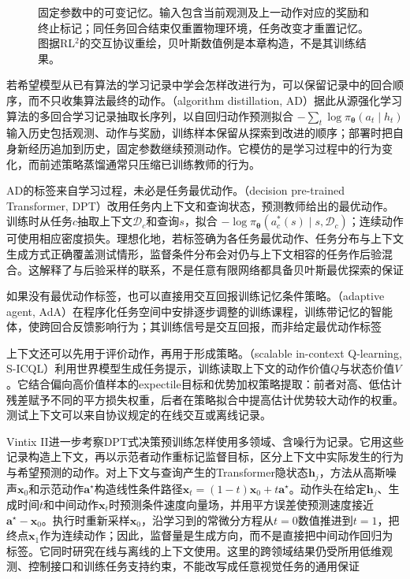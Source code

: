 \begin{figure}[htbp]
 \centering
 
 \caption{固定参数中的可变记忆。输入包含当前观测及上一动作对应的奖励和终止标记；同任务回合结束仅重置物理环境，任务改变才重置记忆。图据RL$^2$的交互协议重绘，贝叶斯数值例是本章构造，不是其训练结果。}
 \label{fig:rl-transfer-rl2-memory}
\end{figure}

若希望模型从已有算法的学习记录中学会怎样改进行为，可以保留记录中的回合顺序，而不只收集算法最终的动作。（algorithm distillation, AD）据此从源强化学习算法的多回合学习记录抽取长序列，以自回归动作预测拟合
$-\sum_t\log\pi_{\bm\theta}(a_t\mid h_t)$
输入历史包括观测、动作与奖励，训练样本保留从探索到改进的顺序；部署时把自身新经历追加到历史，固定参数继续预测动作。它模仿的是学习过程中的行为变化，而前述策略蒸馏通常只压缩已训练教师的行为。

AD的标签来自学习过程，未必是任务最优动作。（decision pre-trained Transformer, DPT）改用任务内上下文和查询状态，预测教师给出的最优动作。训练时从任务$c$抽取上下文$\mathcal D_c$和查询$s$，拟合
$-\log\pi_{\bm\theta}(a_c^*(s)\mid s,\mathcal D_c)$；连续动作可使用相应密度损失。理想化地，若标签确为各任务最优动作、任务分布与上下文生成方式正确覆盖测试情形，监督条件分布会对仍与上下文相容的任务作后验混合。这解释了与后验采样的联系，不是任意有限网络都具备贝叶斯最优探索的保证

如果没有最优动作标签，也可以直接用交互回报训练记忆条件策略。（adaptive agent, AdA）在程序化任务空间中安排逐步调整的训练课程，训练带记忆的智能体，使跨回合反馈影响行为；其训练信号是交互回报，而非给定最优动作标签

上下文还可以先用于评价动作，再用于形成策略。（scalable in-context Q-learning, S-ICQL）利用世界模型生成任务提示，训练读取上下文的动作价值$Q$与状态价值$V$。它结合偏向高价值样本的expectile目标和优势加权策略提取：前者对高、低估计残差赋予不同的平方损失权重，后者在策略拟合中提高估计优势较大动作的权重。测试上下文可以来自协议规定的在线交互或离线记录。

Vintix II进一步考察DPT式决策预训练怎样使用多领域、含噪行为记录。它用这些记录构造上下文，再以示范者动作重标记监督目标，区分上下文中实际发生的行为与希望预测的动作。对上下文与查询产生的Transformer隐状态$\bm h_j$，方法从高斯噪声$\bm x_0$和示范动作$\bm a^\star$构造线性条件路径$\bm x_t=(1-t)\bm x_0+t\bm a^\star$。动作头在给定$\bm h_j$、生成时间$t$和中间动作$\bm x_t$时预测条件速度向量场，并用平方误差使预测速度接近$\bm a^\star-\bm x_0$。执行时重新采样$\bm x_0$，沿学习到的常微分方程从$t=0$数值推进到$t=1$，把终点$\bm x_1$作为连续动作；因此，监督量是生成方向，而不是直接把中间动作回归为标签。它同时研究在线与离线的上下文使用。这里的跨领域结果仍受所用低维观测、控制接口和训练任务支持约束，不能改写成任意视觉任务的通用保证

